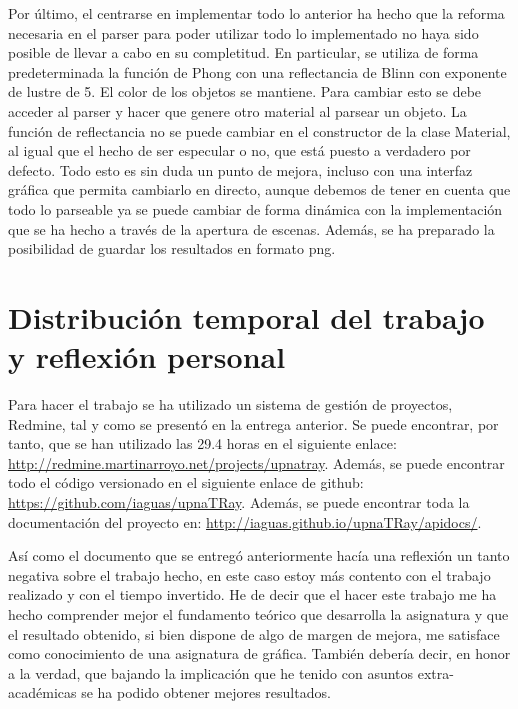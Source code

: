 \documentclass[a4paper,11pt,final]{scrartcl}
\begin{document}
Por último, el centrarse en implementar todo lo anterior ha hecho que la reforma necesaria en el parser para poder utilizar todo lo implementado no haya sido posible de llevar a cabo en su completitud. En particular, se utiliza de forma predeterminada la función de Phong con una reflectancia de Blinn con exponente de lustre de 5. El color de los objetos se mantiene. Para cambiar esto se debe acceder al parser y hacer que genere otro material al parsear un objeto. La función de reflectancia no se puede cambiar en el constructor de la clase {\ttfamily Material}, al igual que el hecho de ser especular o no, que está puesto a verdadero por defecto. Todo esto es sin duda un punto de mejora, incluso con una interfaz gráfica que permita cambiarlo en directo, aunque debemos de tener en cuenta que todo lo parseable ya se puede cambiar de forma dinámica con la implementación que se ha hecho a través de la apertura de escenas. Además, se ha preparado la posibilidad de guardar los resultados en formato png.

\section{Distribución temporal del trabajo y reflexión personal}

Para hacer el trabajo se ha utilizado un sistema de gestión de proyectos, Redmine, tal y como se presentó en la entrega anterior. Se puede encontrar, por tanto, que se han utilizado las 29.4 horas en el siguiente enlace: \href{http://redmine.martinarroyo.net/projects/upnatray}{http://redmine.martinarroyo.net/projects/upnatray}. Además, se puede encontrar todo el código versionado en el siguiente enlace de github: 
\href{https://github.com/iaguas/upnaTRay}{https://github.com/iaguas/upnaTRay}. Además, se puede encontrar toda la documentación del proyecto en: \href{http://iaguas.github.io/upnaTRay/apidocs/}{http://iaguas.github.io/upnaTRay/apidocs/}.

Así como el documento que se entregó anteriormente hacía una reflexión un tanto negativa sobre el trabajo hecho, en este caso estoy más contento con el trabajo realizado y con el tiempo invertido. He de decir que el hacer este trabajo me ha hecho comprender mejor el fundamento teórico que desarrolla la asignatura y que el resultado obtenido, si bien dispone de algo de margen de mejora, me satisface como conocimiento de una asignatura de gráfica. También debería decir, en honor a la verdad, que bajando la implicación que he tenido con asuntos extra-académicas se ha podido obtener mejores resultados.
\end{document}
